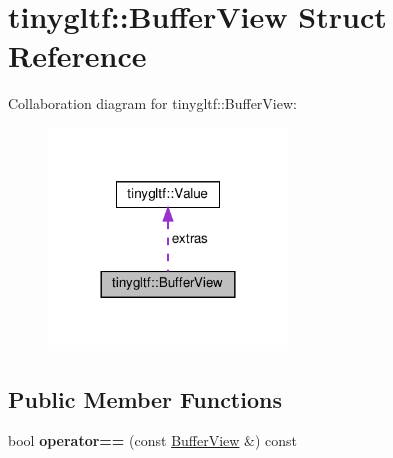 \hypertarget{structtinygltf_1_1BufferView}{}\section{tinygltf\+:\+:Buffer\+View Struct Reference}
\label{structtinygltf_1_1BufferView}


Collaboration diagram for tinygltf\+:\+:Buffer\+View\+:\nopagebreak
\begin{figure}[H]
\begin{center}
\leavevmode
\includegraphics[width=180pt]{structtinygltf_1_1BufferView__coll__graph}
\end{center}
\end{figure}
\subsection*{Public Member Functions}
\begin{DoxyCompactItemize}
\item 
\mbox{\label{structtinygltf_1_1BufferView_a0761a514b796dfd9ba454cabfa76489e}} 
bool {\bfseries operator==} (const \hyperlink{structtinygltf_1_1BufferView}{Buffer\+View} \&) const
\end{DoxyCompactItemize}
